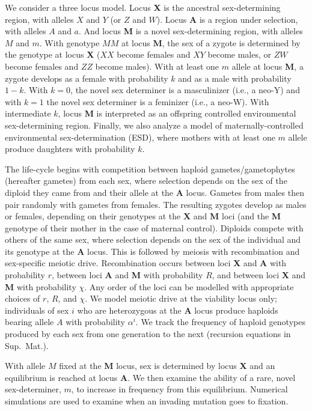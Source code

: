 \documentclass[12pt]{article}
\begin{document}
We consider a three locus model.
Locus \textbf{X} is the ancestral sex-determining region, with alleles $X$ and $Y$ (or $Z$ and $W$).
Locus \textbf{A} is a region under selection, with alleles $A$ and $a$.
And locus \textbf{M} is a novel sex-determining region, with alleles $M$ and $m$.
With genotype $MM$ at locus \textbf{M}, the sex of a zygote is determined by the genotype at locus \textbf{X} ($XX$ become females and $XY$ become males, or $ZW$ become females and $ZZ$ become males).
With at least one $m$ allele at locus \textbf{M}, a zygote develops as a female with probability $k$ and as a male with probability $1-k$.
With $k=0$, the novel sex determiner is a masculinizer (i.e., a neo-Y) and with $k=1$ the novel sex determiner is a feminizer (i.e., a neo-W).
With intermediate $k$, locus \textbf{M} is interpreted as an offspring controlled environmental sex-determining region.
Finally, we also analyze a model of maternally-controlled environmental sex-determination (ESD), where mothers with at least one $m$ allele produce daughters with probability $k$. 

The life-cycle begins with competition between haploid gametes/gametophytes (hereafter gametes) from each sex, where selection depends on the sex of the diploid they came from and their allele at the \textbf{A} locus.
Gametes from males then pair randomly with gametes from females.
The resulting zygotes develop as males or females, depending on their genotypes at the \textbf{X} and \textbf{M} loci (and the \textbf{M} genotype of their mother in the case of maternal control).
Diploids compete with others of the same sex, where selection depends on the sex of the individual and its genotype at the \textbf{A} locus.
This is followed by meiosis with recombination and sex-specific meiotic drive. 
Recombination occurs between loci \textbf{X} and \textbf{A} with probability $r$, between loci \textbf{A} and \textbf{M} with probability $R$, and between loci \textbf{X} and \textbf{M} with probability $\chi$. %
Any order of the loci can be modelled with appropriate choices of $r$, $R$, and $\chi$.
We model meiotic drive at the viability locus only; individuals of sex $i$ who are heterozygous at the \textbf{A} locus produce haploids bearing allele $A$ with probability $\alpha^i$.
We track the frequency of haploid genotypes produced by each sex from one generation to the next (recursion equations in Sup.\ Mat.).

With allele $M$ fixed at the \textbf{M} locus, sex is determined by locus \textbf{X} and an equilibrium is reached at locus \textbf{A}. %
We then examine the ability of a rare, novel sex-determiner, $m$, to increase in frequency from this equilibrium.
Numerical simulations are used to examine when an invading mutation goes to fixation.
\end{document}
